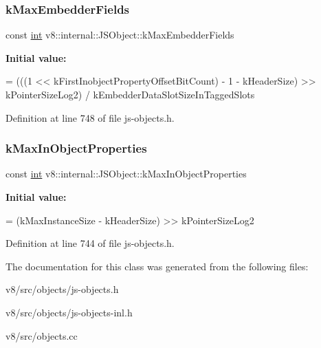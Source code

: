 \subsubsection{\texorpdfstring{k\+Max\+Embedder\+Fields}{kMaxEmbedderFields}}
{\footnotesize\ttfamily const \mbox{\hyperlink{classint}{int}} v8\+::internal\+::\+J\+S\+Object\+::k\+Max\+Embedder\+Fields\hspace{0.3cm}{\ttfamily [static]}}

{\bfseries Initial value\+:}
\begin{DoxyCode}
=
      (((1 << kFirstInobjectPropertyOffsetBitCount) - 1 - kHeaderSize) >>
       kPointerSizeLog2) /
      kEmbedderDataSlotSizeInTaggedSlots
\end{DoxyCode}


Definition at line 748 of file js-\/objects.\+h.

\mbox{\label{classv8_1_1internal_1_1JSObject_a0bf606b9404224d74704d7ff09df5528}} 
\subsubsection{\texorpdfstring{k\+Max\+In\+Object\+Properties}{kMaxInObjectProperties}}
{\footnotesize\ttfamily const \mbox{\hyperlink{classint}{int}} v8\+::internal\+::\+J\+S\+Object\+::k\+Max\+In\+Object\+Properties\hspace{0.3cm}{\ttfamily [static]}}

{\bfseries Initial value\+:}
\begin{DoxyCode}
=
      (kMaxInstanceSize - kHeaderSize) >> kPointerSizeLog2
\end{DoxyCode}


Definition at line 744 of file js-\/objects.\+h.



The documentation for this class was generated from the following files\+:\begin{DoxyCompactItemize}
\item 
v8/src/objects/js-\/objects.\+h\item 
v8/src/objects/js-\/objects-\/inl.\+h\item 
v8/src/objects.\+cc\end{DoxyCompactItemize}
